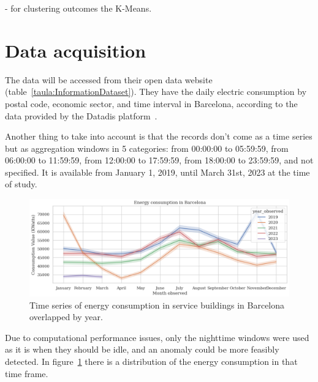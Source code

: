 \documentclass[a4paper,12pt,twoside]{ThesisStyle}
\begin{document}
- for clustering outcomes the K-Means.

\section{Data acquisition}

The data will be accessed from their open data website (table~\ref{taula:InformationDataset}). They have the daily electric consumption by postal code, economic sector, and time interval in Barcelona, according to the data provided by the Datadis platform~\cite{ElectricityBCNOD}. 

Another thing to take into account is that the records don't come as a time series but as aggregation windows in 5 categories: from 00:00:00 to 05:59:59, from 06:00:00 to 11:59:59, from 12:00:00 to 17:59:59, from 18:00:00 to 23:59:59, and not specified. It is available from January 1, 2019, until March 31st, 2023 at the time of study. 

\begin{figure}[hbt]
\centering
\includegraphics[width=13 cm]{imatges/energy_bcn_time_series.png}
\caption{\label{fig:energy_bcn_time_series} Time series of energy consumption in service buildings in Barcelona overlapped by year.}
\end{figure}

Due to computational performance issues, only the nighttime windows were used as it is when they should be idle, and an anomaly could be more feasibly detected. In figure~\ref{fig:energy_bcn_time_series} there is a distribution of the energy consumption in that time frame.
\end{document}
